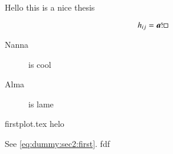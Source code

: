 

Hello this is a nice thesis

\begin{equation}\label{eq:dummy:sec2:first}
    h_{ij} = \boldsymbol{a} \overset{\text{s}}{.} \Box
\end{equation}


\begin{description}
    \item[Nanna] is cool 
    \item[Alma] is lame 
\end{description}


{firstplot.tex}
helo


See \ref{eq:dummy:sec2:first}. fdf